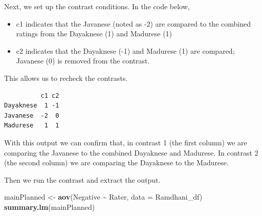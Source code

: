 \documentclass[
  11pt,
]{book}
\newenvironment{Shaded}{\begin{snugshade}}{\end{snugshade}}
\newcommand{\AttributeTok}[1]{\textcolor[rgb]{0.27,0.27,0.27}{#1}}
\newcommand{\CommentTok}[1]{\textcolor[rgb]{0.37,0.37,0.37}{\textit{#1}}}
\newcommand{\DecValTok}[1]{\textcolor[rgb]{0.06,0.06,0.06}{#1}}
\newcommand{\FunctionTok}[1]{\textcolor[rgb]{0.27,0.27,0.27}{\textbf{#1}}}
\newcommand{\NormalTok}[1]{#1}
\newcommand{\OtherTok}[1]{\textcolor[rgb]{0.37,0.37,0.37}{#1}}
\newcommand{\SpecialCharTok}[1]{\textcolor[rgb]{0.43,0.43,0.43}{\textbf{#1}}}
\providecommand{\tightlist}{%
  \setlength{\itemsep}{0pt}\setlength{\parskip}{0pt}}
\begin{document}
Next, we set up the contrast conditions. In the code below,

\begin{itemize}
\tightlist
\item
  c1 indicates that the Javanese (noted as -2) are compared to the combined ratings from the Dayaknese (1) and Madurese (1)
\item
  c2 indicates that the Dayaknese (-1) and Madurese (1) are compared; Javanese (0) is removed from the contrast.
\end{itemize}

\begin{Shaded}
\end{Shaded}

This allows us to recheck the contrasts.

\begin{Shaded}
\end{Shaded}

\begin{verbatim}
          c1 c2
Dayaknese  1 -1
Javanese  -2  0
Madurese   1  1
\end{verbatim}

With this output we can confirm that, in contrast 1 (the first column) we are comparing the Javanese to the combined Dayaknese and Madurese. In contrast 2 (the second column) we are comparing the Dayaknese to the Madurese.

Then we run the contrast and extract the output.

\begin{Shaded}
\begin{Highlighting}[]
\NormalTok{mainPlanned }\OtherTok{\textless{}{-}} \FunctionTok{aov}\NormalTok{(Negative }\SpecialCharTok{\textasciitilde{}}\NormalTok{ Rater, }\AttributeTok{data =}\NormalTok{ Ramdhani\_df)}
\FunctionTok{summary.lm}\NormalTok{(mainPlanned)}
\end{Highlighting}
\end{Shaded}
\end{document}
